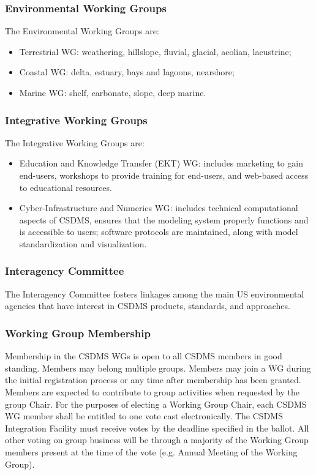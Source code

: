 \documentclass[11pt, oneside]{article}   	%
\begin{document}
\subsubsection{Environmental Working Groups}

The Environmental Working Groups are: 
\begin{itemize}
\item	Terrestrial WG: weathering, hillslope, fluvial, glacial, aeolian, lacustrine; 	
\item	Coastal WG: delta, estuary, bays and lagoons, nearshore; 
\item	Marine WG: shelf, carbonate, slope, deep marine.   
\end{itemize}

\subsubsection{Integrative Working Groups}

The Integrative Working Groups are: 
\begin{itemize}
\item  Education and Knowledge Transfer (EKT) WG: includes marketing to gain end-users, workshops to provide training for end-users, and web-based access to educational resources.  
\item  Cyber-Infrastructure and Numerics WG: includes technical computational aspects of CSDMS, ensures that the modeling system properly functions and is accessible to users; software protocols are maintained, along with model standardization and visualization.  
\end{itemize}

\subsubsection{Interagency Committee}

The Interagency Committee fosters linkages among the main US environmental agencies that have interest in CSDMS products, standards, and approaches.

\subsubsection{Working Group Membership}

Membership in the CSDMS WGs is open to all CSDMS members in good standing.  Members may belong multiple groups.  Members may join a WG during the initial registration process or any time after membership has been granted. Members are expected to contribute to group activities when requested by the group Chair. For the purposes of electing a Working Group Chair, each CSDMS WG member shall be entitled to one vote cast electronically.  The CSDMS Integration Facility must receive votes by the deadline specified in the ballot.  All other voting on group business will be through a majority of the Working Group members present at the time of the vote (e.g. Annual Meeting of the Working Group).
\end{document}
